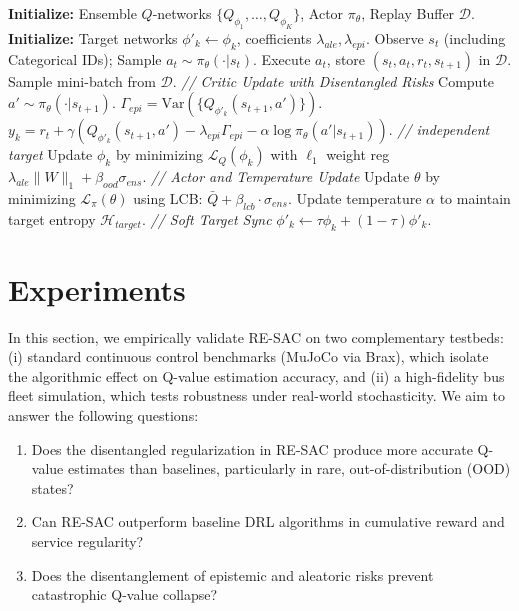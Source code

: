 \documentclass[10pt]{article}
\begin{document}
\begin{algorithm}[H]
\caption{Robust-Ensemble Soft Actor-Critic (RE-SAC)}
\label{alg:resac}
\begin{algorithmic}
\STATE \textbf{Initialize:} Ensemble $Q$-networks $\{Q_{\phi_1}, \dots, Q_{\phi_K}\}$, Actor $\pi_\theta$, Replay Buffer $\mathcal{D}$.
\STATE \textbf{Initialize:} Target networks $\phi'_k \leftarrow \phi_k$, coefficients $\lambda_{ale}, \lambda_{epi}$.
        \STATE Observe $s_t$ (including Categorical IDs); Sample $a_t \sim \pi_\theta(\cdot|s_t)$.
        \STATE Execute $a_t$, store $(s_t, a_t, r_t, s_{t+1})$ in $\mathcal{D}$.
        \STATE Sample mini-batch from $\mathcal{D}$.
        \STATE \textit{// Critic Update with Disentangled Risks}
        \STATE Compute $a' \sim \pi_\theta(\cdot|s_{t+1})$.
        \STATE $\Gamma_{epi} = \text{Var}(\{Q_{\phi'_k}(s_{t+1}, a')\})$.
            \STATE $y_k = r_t + \gamma \left( Q_{\phi'_k}(s_{t+1}, a') - \lambda_{epi} \Gamma_{epi} - \alpha \log \pi_\theta(a'|s_{t+1}) \right)$. \hfill \textit{// independent target}
            \STATE Update $\phi_k$ by minimizing $\mathcal{L}_Q(\phi_k)$ with $\ell_1$ weight reg $\lambda_{ale} \|W\|_1 + \beta_{ood} \sigma_{ens}$.
        \ENDFOR
        \STATE \textit{// Actor and Temperature Update}
        \STATE Update $\theta$ by minimizing $\mathcal{L}_\pi(\theta)$ using LCB: $\bar{Q} + \beta_{lcb} \cdot \sigma_{ens}$.
        \STATE Update temperature $\alpha$ to maintain target entropy $\mathcal{H}_{target}$.
        \STATE \textit{// Soft Target Sync}
        \STATE $\phi'_k \leftarrow \tau \phi_k + (1-\tau) \phi'_k$.
    \ENDFOR
\ENDFOR
\end{algorithmic}
\end{algorithm}

\section{Experiments}
In this section, we empirically validate RE-SAC on two complementary testbeds: (i) standard continuous control benchmarks (MuJoCo via Brax), which isolate the algorithmic effect on Q-value estimation accuracy, and (ii) a high-fidelity bus fleet simulation, which tests robustness under real-world stochasticity. We aim to answer the following questions:
\begin{enumerate}[leftmargin=*,itemsep=2pt]
    \item Does the disentangled regularization in RE-SAC produce more accurate Q-value estimates than baselines, particularly in rare, out-of-distribution (OOD) states?
    \item Can RE-SAC outperform baseline DRL algorithms in cumulative reward and service regularity?
    \item Does the disentanglement of epistemic and aleatoric risks prevent catastrophic Q-value collapse?
\end{enumerate}
\end{document}
